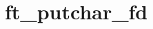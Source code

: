 \chapter{ft\+\_\+putchar\+\_\+fd}
\hypertarget{md_Documentation_2ft__putchar__fd}{}\label{md_Documentation_2ft__putchar__fd}
